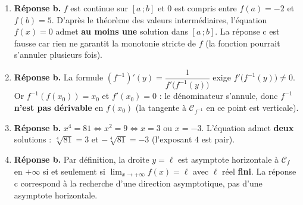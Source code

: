\documentclass[11pt]{article}
\begin{document}
\begin{corrige}
\begin{enumerate}
\item \textbf{Réponse b.} $f$ est continue sur $[a\,;b]$ et $0$ est compris entre $f(a)=-2$ et $f(b)=5$. D'après le théorème des valeurs intermédiaires, l'équation $f(x)=0$ admet \textbf{au moins une} solution dans $[a\,;b]$. La réponse c est fausse car rien ne garantit la monotonie stricte de $f$ (la fonction pourrait s'annuler plusieurs fois).

\item \textbf{Réponse b.} La formule $(f^{-1})'(y)=\dfrac{1}{f'\big(f^{-1}(y)\big)}$ exige $f'\big(f^{-1}(y)\big)\neq 0$. Or $f^{-1}(f(x_0))=x_0$ et $f'(x_0)=0$ : le dénominateur s'annule, donc $f^{-1}$ \textbf{n'est pas dérivable} en $f(x_0)$ (la tangente à $\mathcal{C}_{f^{-1}}$ en ce point est verticale).

\item \textbf{Réponse b.} $x^4=81 \iff x^2=9 \iff x=3$ ou $x=-3$. L'équation admet \textbf{deux} solutions : $\sqrt[4]{81}=3$ et $-\sqrt[4]{81}=-3$ (l'exposant $4$ est pair).

\item \textbf{Réponse b.} Par définition, la droite $y=\ell$ est asymptote horizontale à $\mathcal{C}_f$ en $+\infty$ si et seulement si $\lim_{x\to+\infty}f(x)=\ell$ avec $\ell$ réel \textbf{fini}. La réponse c correspond à la recherche d'une direction asymptotique, pas d'une asymptote horizontale.
\end{enumerate}
\end{corrige}
\end{document}

